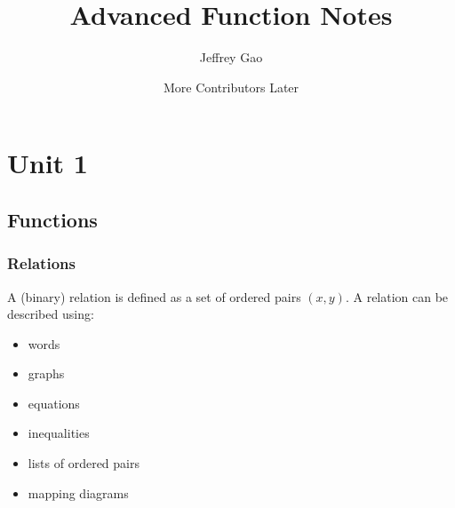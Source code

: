 \documentclass{article}
\title{\vspace{-3ex}Advanced Function Notes}
\author{Jeffrey Gao\and More Contributors Later}
\begin{document}
	\maketitle
	
	\section{Unit 1}
	\subsection{Functions}
	\subsubsection{Relations}
	A (binary) relation is defined as a set of ordered pairs $(x, y)$.
	A relation can be described using:
	\begin{itemize}
		\item words
		\item graphs
		\item equations
		\item inequalities
		\item lists of ordered pairs
		\item mapping diagrams
	\end{itemize}
\end{document}
